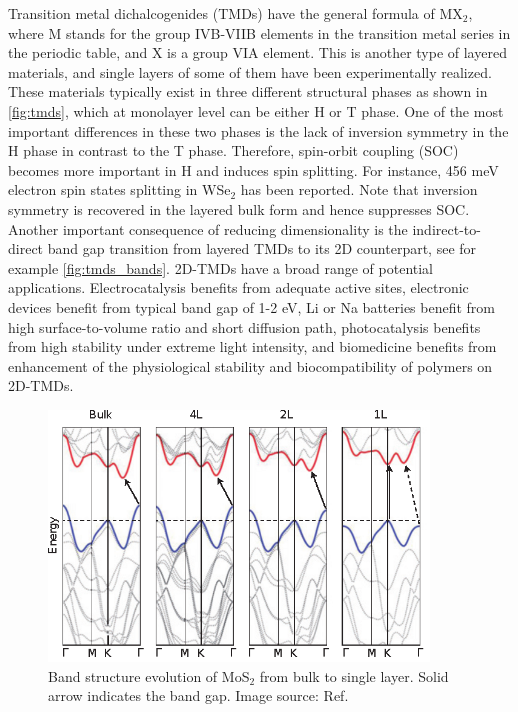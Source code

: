 Transition metal dichalcogenides (TMDs) have the general formula of MX$_2$, where M stands for the group IVB-VIIB elements in the transition metal series in the periodic table, and X is a group VIA element. This is another type of layered materials, and single layers of some of them have been experimentally realized.  These materials typically exist in three different structural phases as shown in \autoref{fig:tmds}, which at monolayer level can be either H or T phase. One of the most important differences in these two phases is the lack of inversion symmetry in the H phase in contrast to the T phase. Therefore, spin-orbit coupling (SOC) becomes more important in H and induces spin splitting. For instance, 456 meV electron spin states splitting in WSe$_2$\cite{Zhu2011giant} has been reported. Note that inversion symmetry is recovered in the layered bulk form and hence suppresses SOC. Another important consequence of reducing dimensionality is the indirect-to-direct band gap transition from layered TMDs to its 2D counterpart, see for example \autoref{fig:tmds_bands}. 2D-TMDs have a broad range of potential applications. Electrocatalysis\cite{kim2013enhanced,huang2014synthesis} benefits from adequate active sites, electronic devices\cite{RadisavljevicB2011,sun2014fabrication} benefit from typical band gap of 1-2 eV, Li or Na batteries\cite{chang2011cysteine,chen2013situ} benefit from high surface-to-volume ratio and short diffusion path, photocatalysis benefits from high stability under extreme light intensity\cite{Li2013,Parzinger2015}, and biomedicine benefits from enhancement of the physiological stability and biocompatibility of polymers on 2D-TMDs\cite{Cheng2014,Yin2014}. 



\begin{figure}[htbp!] 
\centering  
\includegraphics[width=0.9\textwidth]{tmds_bands.eps}
\caption[Band structure evolution of MoS$_2$ from bulk to single layer]{Band structure evolution of MoS$_2$ from bulk to single layer. Solid arrow indicates the band gap. Image source: Ref. \cite{Chhowalla2013}}  
\label{fig:tmds_bands}
\end{figure} 


